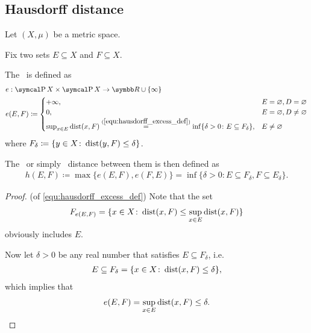 \subsection{Hausdorff distance}\label{sec:hausdorff_distance}

Let \( (X, \mu) \) be a metric space.

\begin{definition}\label{def:hausdorff_distance}\cite[144]{Dontchev2014}
  Fix two sets \( E \subseteq X \) and \( F \subseteq X \).

  The~ is defined as
  \begin{align}\label{equ:hausdorff_excess_def}
    &e: \Power X \times \Power X \to \BB{R} \cup \{ \infty \} \\ \nonumber
    &e(E, F) \coloneqq \begin{cases}
      +\infty, &E = \varnothing, D = \varnothing \\
      0, &E = \varnothing, D \neq \varnothing \\
      \sup_{x \in E} \Dist(x, F) \stackrel{(\ref{equ:hausdorff_excess_def})}{=} \inf \{\delta > 0 \colon E \subseteq F_\delta \}, &E \neq \varnothing \nonumber\refstepcounter{equation}
    \end{cases}
  \end{align}
  where \( F_\delta \coloneqq \{ y \in X \colon \operatorname{dist}(y, F) \leq \delta \} \).

  The~ or simply~ distance between them is then defined as
  \begin{align*}
    h(E, F) \coloneqq \max\{ e(E, F), e(F, E) \} = \inf \{\delta > 0 \colon E \subseteq F_\delta, F \subseteq E_\delta \}.
  \end{align*}
\end{definition}
\begin{proof}(of \ref{equ:hausdorff_excess_def})
  Note that the set
  \begin{align*}
    F_{e(E, F)} = \{ x \in X \colon \operatorname{dist}(x, F) \leq \sup_{x \in E} \operatorname{dist}(x, F) \}
  \end{align*}
  obviously includes \( E \).

  Now let \( \delta > 0 \) be any real number that satisfies \( E \subseteq F_\delta \), i.e.
  \begin{align*}
    E \subseteq F_\delta = \{ x \in X \colon \operatorname{dist}(x, F) \leq \delta \},
  \end{align*}
  which implies that
  \begin{align*}
    e(E, F) = \sup_{x \in E} \operatorname{dist}(x, F) \leq \delta.
  \end{align*}
\end{proof}

